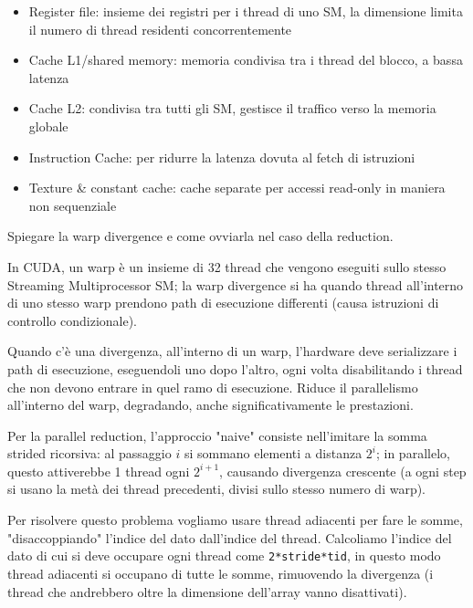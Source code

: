 \begin{questions}
\begin{solution}
\begin{itemize}
            \item Register file: insieme dei registri per i thread di uno SM, la dimensione limita il numero di thread residenti concorrentemente 
            
            \item Cache L1/shared memory: memoria condivisa tra i thread del blocco, a bassa latenza
            
            \item Cache L2: condivisa tra tutti gli SM, gestisce il traffico verso la memoria globale
            
            \item Instruction Cache: per ridurre la latenza dovuta al fetch di istruzioni
            
            \item Texture \& constant cache: cache separate per accessi read-only in maniera non sequenziale
        \end{itemize}
    \end{solution}
    
    \question Spiegare la warp divergence e come ovviarla nel caso della reduction.
    
    \begin{solution}
        In CUDA, un warp è un insieme di 32 thread che vengono eseguiti sullo stesso Streaming Multiprocessor SM; la warp divergence si ha quando thread all'interno di uno stesso warp prendono path di esecuzione differenti (causa istruzioni di controllo condizionale).
        
        Quando c'è una divergenza, all'interno di un warp, l'hardware deve serializzare i path di esecuzione, eseguendoli uno dopo l'altro, ogni volta disabilitando i thread che non devono entrare in quel ramo di esecuzione. Riduce il parallelismo all'interno del warp, degradando, anche significativamente le prestazioni.
        
        Per la parallel reduction, l'approccio "naive" consiste nell'imitare la somma strided ricorsiva: al passaggio $i$ si sommano elementi a distanza $2^i$; in parallelo, questo attiverebbe 1 thread ogni $2^{i+1}$, causando divergenza crescente (a ogni step si usano la metà dei thread precedenti, divisi sullo stesso numero di warp).
        
        Per risolvere questo problema vogliamo usare thread adiacenti per fare le somme, "disaccoppiando" l'indice del dato dall'indice del thread. Calcoliamo l'indice del dato di cui si deve occupare ogni thread come \texttt{2*stride*tid}, in questo modo thread adiacenti si occupano di tutte le somme, rimuovendo la divergenza (i thread che andrebbero oltre la dimensione dell'array vanno disattivati).
        

\end{solution}
\end{questions}
